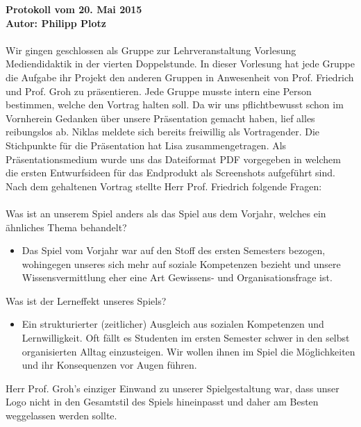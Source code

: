 \documentclass[a4paper,10pt]{article}
\begin{document}
{\bfseries \large Protokoll vom 20. Mai 2015 \\[1mm]		%
\normalfont Autor: Philipp Plotz}					%

\paragraph{}
Wir gingen geschlossen als Gruppe zur Lehrveranstaltung Vorlesung Mediendidaktik in der vierten Doppelstunde. In dieser Vorlesung hat jede Gruppe die Aufgabe ihr Projekt den anderen Gruppen in Anwesenheit von Prof. Friedrich und Prof. Groh zu präsentieren. Jede Gruppe musste intern eine Person bestimmen, welche den Vortrag halten soll. Da wir uns pflichtbewusst schon im Vornherein Gedanken über unsere Präsentation gemacht haben, lief alles reibungslos ab. Niklas meldete sich bereits freiwillig als Vortragender. Die Stichpunkte für die Präsentation hat Lisa zusammengetragen. Als Präsentationsmedium wurde uns das Dateiformat PDF vorgegeben in welchem die ersten Entwurfsideen für das Endprodukt als Screenshots aufgeführt sind. Nach dem gehaltenen Vortrag stellte Herr Prof. Friedrich folgende Fragen:\\\\
Was ist an unserem Spiel anders als das Spiel aus dem Vorjahr, welches ein ähnliches Thema behandelt?
\begin{itemize}
	\item Das Spiel vom Vorjahr war auf den Stoff des ersten Semesters bezogen, wohingegen unseres sich mehr auf soziale Kompetenzen bezieht und unsere Wissensvermittlung eher eine Art Gewissens- und Organisationsfrage ist.
\end{itemize} 
Was ist der Lerneffekt unseres Spiels?
\begin{itemize}
	\item Ein strukturierter (zeitlicher) Ausgleich aus sozialen Kompetenzen und Lernwilligkeit. Oft fällt es Studenten im ersten Semester schwer in den  selbst organisierten Alltag einzusteigen. Wir wollen ihnen im Spiel die Möglichkeiten und ihr Konsequenzen vor Augen führen.
\end{itemize}
Herr Prof. Groh’s einziger Einwand zu unserer Spielgestaltung war, dass unser Logo nicht in den Gesamtstil des Spiels hineinpasst und daher am Besten weggelassen werden sollte.
\end{document}
